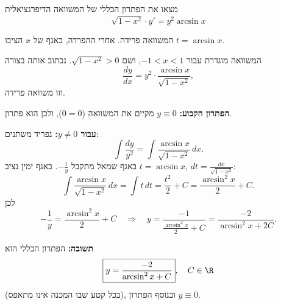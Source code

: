 
\begin{question}
מצאו את הפתרון הכללי של המשוואה הדיפרנציאלית
\[ \sqrt{1 - x^2} \cdot y' = y^2 \arcsin x \]
\end{question}

\begin{hint}
המשוואה פרידה. אחרי ההפרדה, באגף של $x$ הציבו $t = \arcsin x$.
\end{hint}

\begin{solution}
המשוואה מוגדרת עבור $-1 < x < 1$, ושם $\sqrt{1 - x^2} > 0$. נכתוב אותה בצורה
\[ \frac{dy}{dx} = y^2 \cdot \frac{\arcsin x}{\sqrt{1 - x^2}}, \]
וזו משוואה פרידה.

\textbf{הפתרון הקבוע:} $y \equiv 0$ מקיים את המשוואה ($0 = 0$), ולכן הוא פתרון.

\textbf{עבור $y \ne 0$:} נפריד משתנים:
\[ \int \frac{dy}{y^2} = \int \frac{\arcsin x}{\sqrt{1 - x^2}}\,dx. \]
באגף שמאל מתקבל $-\frac{1}{y}$. באגף ימין נציב $t = \arcsin x$, $dt = \frac{dx}{\sqrt{1 - x^2}}$:
\[ \int \frac{\arcsin x}{\sqrt{1 - x^2}}\,dx = \int t\,dt = \frac{t^2}{2} + C = \frac{\arcsin^2 x}{2} + C. \]
לכן
\[ -\frac{1}{y} = \frac{\arcsin^2 x}{2} + C \quad\Longrightarrow\quad y = \frac{-1}{\frac{\arcsin^2 x}{2} + C} = \frac{-2}{\arcsin^2 x + 2C}. \]

\textbf{תשובה:} הפתרון הכללי הוא
\[ \boxed{y = \frac{-2}{\arcsin^2 x + C}}, \quad C \in \R \]
(בכל קטע שבו המכנה אינו מתאפס), ובנוסף הפתרון $y \equiv 0$.
\end{solution}
